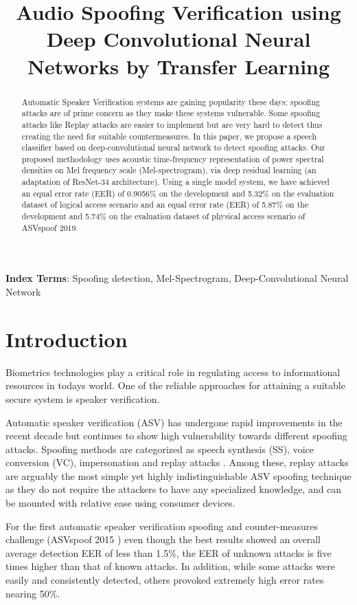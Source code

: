 \documentclass[a4paper]{article}
\title{Audio Spoofing Verification using Deep Convolutional Neural Networks by Transfer Learning}
\begin{document}
\maketitle

\begin{abstract}
    Automatic Speaker Verification systems are gaining popularity these days; spoofing attacks are of prime concern as they make these systems vulnerable. Some spoofing attacks like Replay attacks are easier to implement but are very hard to detect thus creating the need for suitable countermeasures. In this paper, we propose a speech classifier based on deep-convolutional neural network to detect spoofing attacks. Our proposed methodology uses acoustic time-frequency representation of power spectral densities on Mel frequency scale (Mel-spectrogram), via deep residual learning (an adaptation of ResNet-34 architecture). Using a single model system, we have achieved an equal error rate (EER) of 0.9056\% on the development and 5.32\% on the evaluation dataset of logical access scenario and an equal error rate (EER) of 5.87\% on the development and 5.74\% on the evaluation dataset of physical access scenario of ASVspoof 2019.
 
\end{abstract}

\noindent\textbf{Index Terms}: Spoofing detection, Mel-Spectrogram, Deep-Convolutional Neural Network

\section{Introduction}

    Biometrics technologies play a critical role in regulating access to informational resources in today\textquotesingle s world. One of the reliable approaches for attaining a suitable secure system is speaker verification.
    
    Automatic speaker verification (ASV) has undergone rapid improvements in the recent decade but continues to show high vulnerability towards different spoofing attacks. Spoofing methods are categorized as speech synthesis (SS), voice conversion (VC), impersonation and replay attacks \cite{spoofingmethods}. Among these, replay attacks are arguably the most simple yet highly indistinguishable ASV spoofing technique as they do not require the attackers to have any specialized knowledge, and can be mounted with relative ease using consumer devices.
    
    For the first automatic speaker verification spoofing and counter-measures challenge (ASVspoof 2015 \cite{asvspoof15}) even though the best results showed an overall average detection EER of less than 1.5\%, the EER of unknown attacks is five times higher than that of known attacks. In addition, while some attacks were easily and consistently detected, others provoked extremely high error rates nearing 50\%.
    
\end{document}
